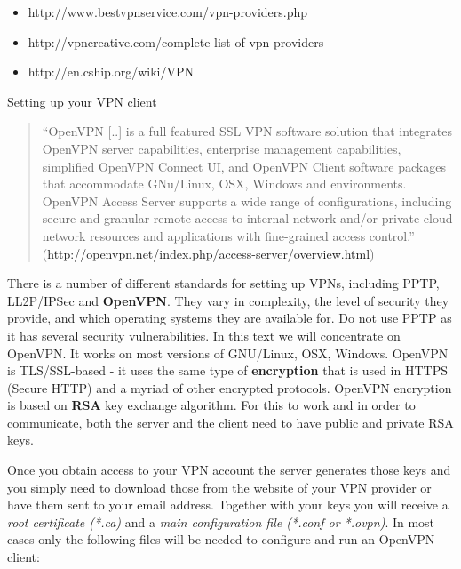 \begin{itemize}
\item
  http://www.bestvpnservice.com/vpn-providers.php
\item
  http://vpncreative.com/complete-list-of-vpn-providers
\item
  http://en.cship.org/wiki/VPN
\end{itemize}
Setting up your VPN client

\begin{quote}
``OpenVPN {[}..{]} is a full featured SSL VPN software solution that
integrates OpenVPN server capabilities, enterprise management
capabilities, simplified OpenVPN Connect UI, and OpenVPN Client software
packages that accommodate GNu/Linux, OSX, Windows and environments.
OpenVPN Access Server supports a wide range of configurations, including
secure and granular remote access to internal network and/or private
cloud network resources and applications with fine-grained access
control.''
(\href{http://openvpn.net/index.php/access-server/overview.html}{http://openvpn.net/index.php/access-server/overview.html})

\end{quote}
There is a number of different standards for setting up VPNs, including
PPTP, LL2P/IPSec and \textbf{OpenVPN}. They vary in complexity, the
level of security they provide, and which operating systems they are
available for. Do not use PPTP as it has several security
vulnerabilities. In this text we will concentrate on OpenVPN. It works
on most versions of GNU/Linux, OSX, Windows. OpenVPN is TLS/SSL-based -
it uses the same type of \textbf{encryption} that is used in HTTPS
(Secure HTTP) and a myriad of other encrypted protocols. OpenVPN
encryption is based on \textbf{RSA} key exchange algorithm. For this to
work and in order to communicate, both the server and the client need to
have public and private RSA keys.

Once you obtain access to your VPN account the server generates those
keys and you simply need to download those from the website of your VPN
provider or have them sent to your email address. Together with your
keys you will receive a \emph{root certificate (*.ca)} and a \emph{main
configuration file (*.conf or *.ovpn)}. In most cases only the following
files will be needed to configure and run an OpenVPN client:

